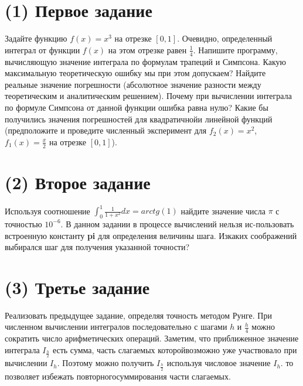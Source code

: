 \tableofcontents
\newpage
\section{(1) Первое задание}
Задайте функцию $f(x) = x^{3}$ на отрезке $[0, 1]$. Очевидно, определенный интеграл от функции $f(x)$ на этом отрезке равен $\frac{1}{4}$. Напишите программу, вычисляющую значение интеграла по формулам трапеций и Симпсона. Какую максимальную теоретическую ошибку мы при этом допускаем? Найдите реальные значение погрешности (абсолютное значение разности между теоретическим и аналитическим решением). Почему при вычислении интеграла по формуле Симпсона от данной функции ошибка равна нулю? Какие бы получились значения погрешностей для квадратичнойи линейной функций (предположите и проведите численный эксперимент для $f_{2}(x) = x^{2}$, $f_{1}(x) = \frac{x}{2}$ на отрезке $[0, 1]$).\\[2mm]

\section{(2) Второе задание}
Используя соотношение $\int_{0}^{1}\frac{1}{1+x^{2}}dx = arctg(1)$ найдите значение числа $\pi$ с точностью $10^{-6}$. В данном задании в процессе вычислений нельзя ис-пользовать встроенную константу \textbf{pi} для определения величины шага. Изкаких соображений выбирался шаг для получения указанной точности?

\section{(3) Третье задание}
Реализовать предыдущее задание, определяя точность методом Рунге. При численном вычислении интегралов последовательно с шагами $h$ и $\frac{h}{4}$ можно сократить число арифметических операций. Заметим, что приближенное значение интеграла $I_{\frac{h}{2}}$ есть сумма, часть слагаемых которойвозможно уже участвовало при вычислении $I_{h}$. Поэтому можно получить $I_{\frac{h}{2}}$ используя числовое значение $I_{h}$. то позволяет избежать повторногосуммирования части слагаемых.
